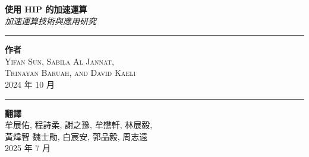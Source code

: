 \begin{titlepage}


\vspace{2.5cm}
\parbox[l]{.9\textwidth}{\centering
    {\HUGE \bfseries 使用 HIP 的加速運算}\\[2\baselineskip]
    {\Large \textit{加速運算技術與應用研究}}\\[.5\baselineskip]}

\vspace*{\fill}

\parbox[b]{.5\textwidth}{
    \rule{1pt}{.125\textheight}
    \hspace{0.025\textwidth}
    \parbox[b]{.8\textwidth}{
        {\Large \bfseries 作者}\\[1\baselineskip]
        {\Large \textsc{Yifan Sun, Sabila Al Jannat, \\ Trinayan Baruah, and David Kaeli}}\\[2\baselineskip]
        {\Large 2024 年 10 月}
    }
}
\parbox[b]{.5\textwidth}{
    \rule{1pt}{.125\textheight}
    \hspace{0.025\textwidth}
    \parbox[b]{.8\textwidth}{
        {\Large \bfseries 翻譯}\\[1\baselineskip]
        {\Large \textsc{牟展佑, 程詩柔, 謝之豫, 牟懋軒, 林展毅, \\ 黃煒智
魏士勛, 白宸安, 郭品毅, 周志遠}}\\[2\baselineskip]
        {\Large 2025 年 7 月}
    }
}
\end{titlepage}
